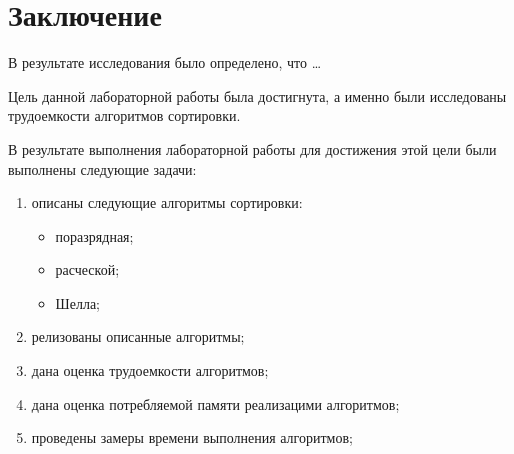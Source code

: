 \chapter*{Заключение}

В результате исследования было определено, что \dots

Цель данной лабораторной работы была достигнута, а именно были исследованы трудоемкости алгоритмов сортировки.

В результате выполнения лабораторной работы для достижения этой цели были выполнены следующие задачи:
\begin{enumerate}
    \item описаны следующие алгоритмы сортировки:
        \begin{itemize}
            \item поразрядная;
            \item расческой;
            \item Шелла;
        \end{itemize}
    \item релизованы описанные алгоритмы;
    \item дана оценка трудоемкости алгоритмов;
    \item дана оценка потребляемой памяти реализацими алгоритмов;
    \item проведены замеры времени выполнения алгоритмов;
\end{enumerate}

